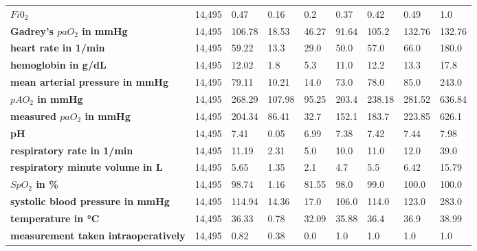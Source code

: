 \documentclass[referee,lineno,pdflatex,sn-nature]{sn-jnl}%
\theoremstyle{thmstyleone}%
\theoremstyle{thmstyletwo}%
\theoremstyle{thmstylethree}%
\begin{document}
\begin{appendices}
\begin{table}
\begin{tabular}{@{} lllllllll @{}}
        \textbf{\footnotemark[2]$Fi0_2$} & 14,495 & 0.47 & 0.16 & 0.2 & 0.37 & 0.42 & 0.49 & 1.0 \\ 
        \textbf{\footnotemark[2]Gadrey’s $paO_2$ in mmHg} & 14,495 & 106.78 & 18.53 & 46.27 & 91.64 & 105.2 & 132.76 & 132.76 \\ 
        \textbf{\footnotemark[2]heart rate in 1/min} & 14,495 & 59.22 & 13.3 & 29.0 & 50.0 & 57.0 & 66.0 & 180.0 \\ 
        \textbf{\footnotemark[2]hemoglobin in g/dL} & 14,495 & 12.02 & 1.8 & 5.3 & 11.0 & 12.2 & 13.3 & 17.8 \\ 
        \textbf{\footnotemark[2]mean arterial pressure in mmHg} & 14,495 & 79.11 & 10.21 & 14.0 & 73.0 & 78.0 & 85.0 & 243.0 \\ 
        \textbf{\footnotemark[2]$pAO_2$ in mmHg} & 14,495 & 268.29 & 107.98 & 95.25 & 203.4 & 238.18 & 281.52 & 636.84 \\ 
        \textbf{\footnotemark[2]measured $paO_2$ in mmHg} & 14,495 & 204.34 & 86.41 & 32.7 & 152.1 & 183.7 & 223.85 & 626.1 \\ 
        \textbf{\footnotemark[2]pH} & 14,495 & 7.41 & 0.05 & 6.99 & 7.38 & 7.42 & 7.44 & 7.98 \\ 
        \textbf{\footnotemark[2]respiratory rate in 1/min} & 14,495 & 11.19 & 2.31 & 5.0 & 10.0 & 11.0 & 12.0 & 39.0 \\ 
        \textbf{\footnotemark[2]respiratory minute volume in L} & 14,495 & 5.65 & 1.35 & 2.1 & 4.7 & 5.5 & 6.42 & 15.79 \\ 
        \textbf{\footnotemark[2]$SpO_2$ in \%} & 14,495 & 98.74 & 1.16 & 81.55 & 98.0 & 99.0 & 100.0 & 100.0 \\ 
        \textbf{\footnotemark[2]systolic blood pressure in mmHg} & 14,495 & 114.94 & 14.36 & 17.0 & 106.0 & 114.0 & 123.0 & 283.0 \\ 
        \textbf{\footnotemark[2]temperature in °C} & 14,495 & 36.33 & 0.78 & 32.09 & 35.88 & 36.4 & 36.9 & 38.99 \\ 
        \textbf{\footnotemark[2]measurement taken intraoperatively} & 14,495 & 0.82 & 0.38 & 0.0 & 1.0 & 1.0 & 1.0 & 1.0 \\ \hline
    \end{tabular}
\end{table}



\end{appendices}
\end{document}

